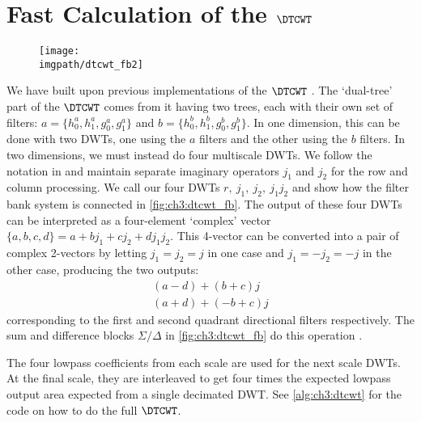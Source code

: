 \section{Fast Calculation of the $\DTCWT$}\label{sec:ch3:dtcwt}
\begin{figure}
  \texttt{[image: \\imgpath/dtcwt\_fb2]}
  \label{fig:ch3:dtcwt_fb}
\end{figure}
We have built upon previous implementations of the $\DTCWT$
\cite{kingsbury_dtcwt_2003, cai_2-d_2011, wareham_dtcwt_2014}. The `dual-tree'
part of the $\DTCWT$ comes from it having two trees, each with their own set of filters:
$a = \{h_0^a, h_1^a, g_0^a, g_1^a\}$ and $b = \{h_0^b, h_1^b, g_0^b, g_1^b\}$. In one dimension, this
can be done with two DWTs, one using the $a$ filters and the other using the $b$
filters. In two dimensions, we must instead do
four multiscale DWTs. We follow the notation in \cite{kingsbury_image_1999} and
maintain separate imaginary operators $j_1$ and $j_2$ for the row and column
processing. We call our four DWTs $r,\ j_1,\ j_2,\ j_1j_2$ and show how the
filter bank system is connected in \autoref{fig:ch3:dtcwt_fb}. The output of
these four DWTs can be interpreted as a four-element `complex' vector $\{a, b,
c, d\} = a + bj_1 + cj_2 + dj_1j_2$. This 4-vector can be converted into a pair
of complex 2-vectors by letting $j_1 = j_2 = j$ in one case and $j_1 = -j_2=-j$
in the other case, producing the two outputs:
\begin{align}
  (a-d) + (b+c)j\\
  (a+d) + (-b+c)j
\end{align}
corresponding to the first and second quadrant directional filters respectively.
The sum and difference blocks $\Sigma/\Delta$ in \autoref{fig:ch3:dtcwt_fb} do
this operation \cite{kingsbury_image_1999}. 

The four lowpass coefficients from each scale are used for the next scale DWTs. At the
final scale, they are interleaved to get four times the expected lowpass output
area expected from a single decimated DWT.
See \autoref{alg:ch3:dtcwt} for the code on how to do the full $\DTCWT$.

